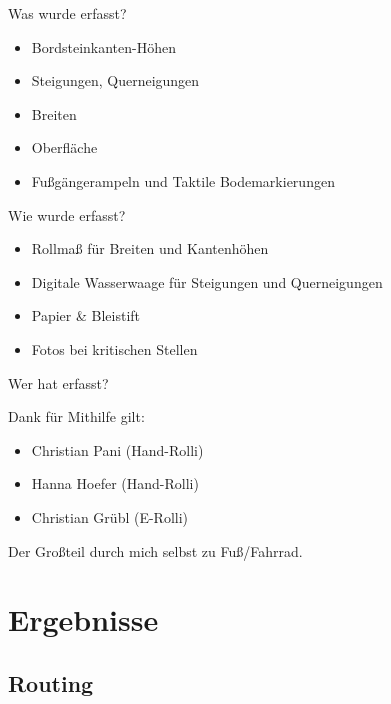 \documentclass{beamer}
\begin{document}
\begin{frame}{Was wurde erfasst?}

    \begin{itemize}
      \item Bordsteinkanten-Höhen
      \item Steigungen, Querneigungen
      \item Breiten
      \item Oberfläche
      \item Fußgängerampeln und Taktile Bodemarkierungen
    \end{itemize}


\end{frame}

\begin{frame}{Wie wurde erfasst?}
    \begin{itemize}
      \item Rollmaß für Breiten und Kantenhöhen
      \item Digitale Wasserwaage für Steigungen und Querneigungen
      \item Papier \& Bleistift
      \item Fotos bei kritischen Stellen
    \end{itemize}

\end{frame}

\begin{frame}{Wer hat erfasst?}

  Dank für Mithilfe gilt:
  \begin{itemize}
        \item Christian Pani (Hand-Rolli)
        \item Hanna Hoefer (Hand-Rolli)
        \item Christian Grübl (E-Rolli)
  \end{itemize}
            \vspace{1cm}

  \pause
  Der Großteil durch mich selbst zu Fuß/Fahrrad.

\end{frame}



\section{Ergebnisse}

\subsection{Routing}
\end{document}
